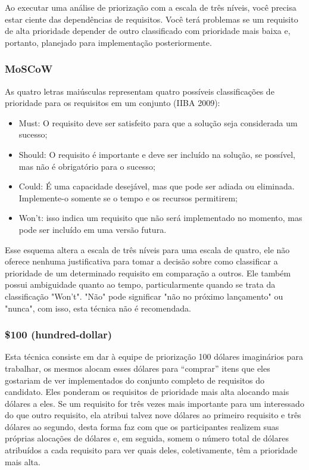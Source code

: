 \documentclass[runningheads]{llncs}
\begin{document}
Ao executar uma análise de priorização com a escala de três níveis, você precisa estar ciente das dependências de requisitos. Você terá problemas se um requisito de alta prioridade depender de outro classificado com prioridade mais baixa e, portanto, planejado para implementação posteriormente.

\subsubsection{MoSCoW}
As quatro letras maiúsculas representam quatro possíveis classificações de prioridade para os requisitos em um conjunto (IIBA 2009): 

\begin{itemize}
    \item Must: O requisito deve ser satisfeito para que a solução seja considerada um sucesso;
    \item Should: O requisito é importante e deve ser incluído na solução, se possível, mas não é obrigatório para o sucesso;
    \item Could: É uma capacidade desejável, mas que pode ser adiada ou eliminada. Implemente-o somente se o tempo e os recursos permitirem;
    \item Won't: isso indica um requisito que não será implementado no momento, mas pode ser incluído em uma versão futura. 
\end{itemize}

Esse esquema altera a escala de três níveis para uma escala de quatro, ele não oferece nenhuma justificativa para tomar a decisão sobre como classificar a prioridade de um determinado requisito em comparação a outros. Ele também possui ambiguidade quanto ao tempo, particularmente quando se trata da classificação "Won't". "Não" pode significar "não no próximo lançamento" ou "nunca", com isso, esta técnica não é recomendada.

\subsubsection{\$100 (hundred-dollar)}
Esta técnica consiste em dar à equipe de priorização 100 dólares imaginários para trabalhar, os mesmos alocam esses dólares para “comprar” itens que eles gostariam de ver implementados do conjunto completo de requisitos do candidato. Eles ponderam os requisitos de prioridade mais alta alocando mais dólares a eles. Se um requisito for três vezes mais importante para um interessado do que outro requisito, ela atribui talvez nove dólares ao primeiro requisito e três dólares ao segundo, desta forma faz com que os participantes realizem suas próprias alocações de dólares e, em seguida, somem o número total de dólares atribuídos a cada requisito para ver quais deles, coletivamente, têm a prioridade mais alta.
\end{document}
